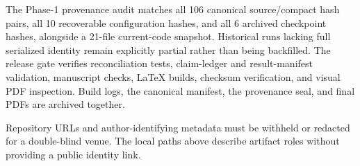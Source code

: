The Phase-1 provenance audit matches all 106 canonical source/compact hash pairs, all 10 recoverable
configuration hashes, and all 6 archived checkpoint hashes, alongside a 21-file current-code
snapshot. Historical runs lacking full serialized identity remain explicitly partial rather
than being backfilled. The release gate verifies reconciliation tests, claim-ledger and result-manifest
validation, manuscript checks, LaTeX builds, checksum verification, and visual PDF inspection. Build
logs, the canonical manifest, the provenance seal, and final PDFs are archived together.

\ifanon
Repository URLs and author-identifying metadata must be withheld or redacted for a double-blind
venue. The local paths above describe artifact roles without providing a public identity link.
\fi
